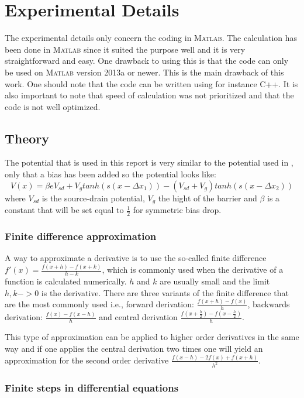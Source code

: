 \documentclass[a4paper]{article}
\begin{document}
\section{Experimental Details}
The experimental details only concern the coding in \textsc{Matlab}.
The calculation has been done in \textsc{Matlab} since it suited the purpose well and it is very straightforward and easy.
One drawback to using this is that the code can only be used on \textsc{Matlab} version 2013a or newer.
This is the main drawback of this work. One should note that the code can be written using for instance C++.
It is also important to note that speed of calculation was not prioritized and that the code is not well optimized.

\subsection{Theory}
The potential that is used in this report is very similar to the potential used in \cite{5}, only that a bias has been added so the potential looks like: \begin{equation}
\label{potential}
V(x) = \beta e V_{sd}+V_{g} tanh(s (x-\Delta x_{1}))-(V_{sd}+V_{g}) tanh(s (x-\Delta x_{2}))
\end{equation}
where $V_{sd}$ is the source-drain potential, $V_{g}$ the hight of the barrier and $\beta$ is a constant that will be set equal to $\frac{1}{2}$ for symmetric bias drop.
\subsubsection{Finite difference approximation}
A way to approximate a derivative is to use the so-called finite difference $f'(x) =\frac{f(x+h)-f(x+k)}{h-k}$, which is commonly used when the derivative of a function is calculated numerically. $h$ and $k$ are usually small and the limit $h,k->0$ is the derivative.
There are three variants of the finite difference that are the most commonly used i.e., forward derivation: $\frac{f(x+h)-f(x)}{h}$, backwards derivation: $\frac{f(x)-f(x-h)}{h}$ and central derivation $\frac{f(x+\frac{h}{2})-f(x-\frac{h}{2})}{h}$.

This type of approximation can be applied to higher order derivatives in the same way and if one applies the central derivation two times one will yield an approximation for the second order derivative $\frac{f(x-h)- 2f(x) +f(x+h)}{h^2}$.

\subsubsection{Finite steps in differential equations}
\end{document}
